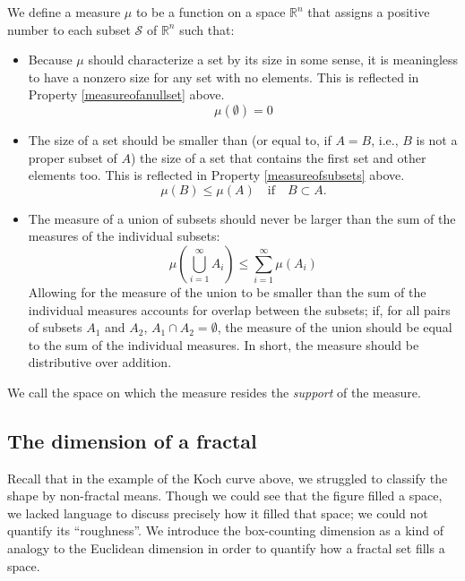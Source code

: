 \begin{mydef}
We define a measure $ \mu $ to be a function on a space $ \mathbb{R}^{n} $ that assigns a positive number to each subset $ \mathcal{S} $ of $ \mathbb{R}^{n} $ such that:

\begin{itemize}
\item Because $\mu$ should characterize a set by its size in some sense, it is meaningless to have a nonzero size for any set with no elements. This is reflected in Property \ref{measureofanullset} above.
\begin{equation}
\mu(\emptyset) = 0
\end{equation}
\item The size of a set should be smaller than (or equal to, if $ A = B $, i.e., $B$ is not a proper subset of $A$) the size of a set that contains the first set and other elements too. This is reflected in Property \ref{measureofsubsets} above.
\begin{equation}
\mu(B) \le \mu(A) \mathrm{ \quad if \quad }  B \subset A.
\end{equation} 
\item The measure of a union of subsets should never be larger than the sum of the measures of the individual subsets: 
\begin{equation}
\mu\left(\bigcup_{i=1}^{\infty} A_i\right) \le \sum_{i=1}^{\infty} \mu(A_i) 
\end{equation}
Allowing for the measure of the union to be smaller than the sum of the individual measures accounts for overlap between the subsets; if, for all pairs of subsets $A_1$ and $A_2$, $A_1 \cap A_2 = \emptyset$, the measure of the union should be equal to the sum of the individual measures. In short, the measure should be distributive over addition.
\end{itemize}
We call the space on which the measure resides the \textit{support} of the measure.
\end{mydef}

\subsection{The dimension of a fractal}
Recall that in the example of the Koch curve above, we struggled to classify the shape by non-fractal means. Though we could see that the figure filled a space, we lacked language to discuss precisely how it filled that space; we could not quantify its ``roughness''. We introduce the box-counting dimension as a kind of analogy to the Euclidean dimension in order to quantify how a fractal set fills a space.

